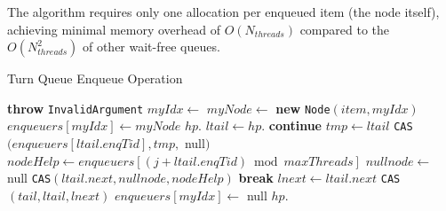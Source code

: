 The algorithm requires only one allocation per enqueued item (the node itself), achieving minimal memory overhead of $O(N_{threads})$ compared to the $O(N_{threads}^2)$ of other wait-free queues. \cite{RamalheteQueue}

\begin{algorithm}[!ht]
    \centering
    \captionsetup{justification=centering}
    \caption{Turn Queue Enqueue Operation \cite{RamalheteQueue}}
    \label{alg:turn-enqueue}
    \scriptsize
    \begin{algorithmic}[1]
             \textbf{throw} \texttt{InvalidArgument}
            \EndIf
            \State $myIdx \gets $ 
            \State $myNode \gets $ \textbf{new} \texttt{Node}$(item, myIdx)$
            \State $enqueuers[myIdx] \gets myNode$
                 
                    \State $hp.$
                    \State \Return
                \EndIf
                \State $ltail \gets hp.$
                 \textbf{continue}
                \EndIf
                 
                    \State $tmp \gets ltail$
                    \State \texttt{CAS}$(enqueuers[ltail.enqTid], tmp,$ null$)$
                \EndIf
                 
                    \State $nodeHelp \gets enqueuers[(j + ltail.enqTid) \bmod maxThreads]$
                        \State $nullnode \gets $ null
                        \State \texttt{CAS}$(ltail.next, nullnode, nodeHelp)$ 
                        \State \textbf{break}
                    \EndIf
                \EndFor
                \State $lnext \gets ltail.next$
                 
                    \State \texttt{CAS}$(tail, ltail, lnext)$
                \EndIf
            \EndFor
            \State $enqueuers[myIdx] \gets $ null 
            \State $hp.$
        \EndFunction
    \end{algorithmic}
\end{algorithm}

